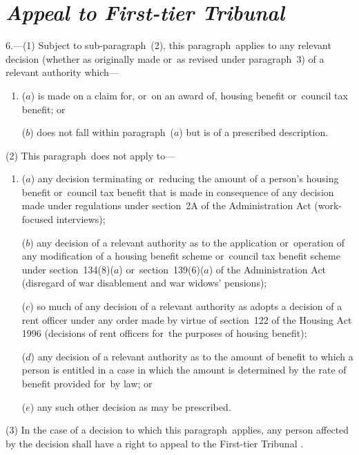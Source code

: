 \documentclass[12pt,a4paper]{article}
\begin{document}
\section*{\itshape Appeal to 
First-tier Tribunal %
}

6.---(1) Subject to sub-paragraph~(2), this paragraph~applies to any relevant decision (whether as originally made or~as revised under paragraph~3) of a relevant authority which—
\begin{enumerate}\item[]
($a$) is made on a claim for, or~on an award of, housing benefit or~council tax benefit; or

($b$) does not fall within paragraph~($a$)  but is of a prescribed description.
\end{enumerate}

(2) This paragraph~does not apply to—
\begin{enumerate}\item[]
($a$) any decision terminating or~reducing the amount of a person’s housing benefit or~council tax benefit that is made in consequence of any decision made under regulations under section~2A of the Administration Act (work-focused interviews);

($b$) any decision of a relevant authority as to the application or~operation of any modification of a housing benefit scheme or~council tax benefit scheme under section~134(8)($a$)  or~section~139(6)($a$)  of the Administration Act (disregard of war disablement and war widows' pensions);

($c$) so much of any decision of a relevant authority as adopts a decision of a rent officer under any order made by virtue of section~122 of the Housing Act 1996 (decisions of rent officers for~the purposes of housing benefit);

($d$) any decision of a relevant authority as to the amount of benefit to which a person is entitled in a case in which the amount is determined by the rate of benefit provided for~by law; or

($e$) any such other decision as may be prescribed.
\end{enumerate}

(3) In the case of a decision to which this paragraph~applies, any person affected by the decision shall have a right to appeal to 
the First-tier Tribunal%
.
\end{document}
